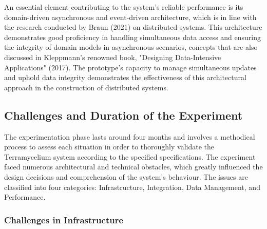 \documentclass[preprint,12pt]{elsarticle}
\begin{document}
An essential element contributing to the system's reliable performance is its domain-driven asynchronous and event-driven architecture, which is in line with the research conducted by Braun (2021) on distributed systems. This architecture demonstrates good proficiency in handling simultaneous data access and ensuring the integrity of domain models in asynchronous scenarios, concepts that are also discussed in Kleppmann's renowned book, "Designing Data-Intensive Applications" (2017). The prototype's capacity to manage simultaneous updates and uphold data integrity demonstrates the effectiveness of this architectural approach in the construction of distributed systems.

\subsection{Challenges and Duration of the Experiment}

The experimentation phase lasts around four months and involves a methodical process to assess each situation in order to thoroughly validate the Terramycelium system according to the specified specifications. The experiment faced numerous architectural and technical obstacles, which greatly influenced the design decisions and comprehension of the system's behaviour. The issues are classified into four categories: Infrastructure, Integration, Data Management, and Performance.

\subsubsection{Challenges in Infrastructure} 
\end{document}
